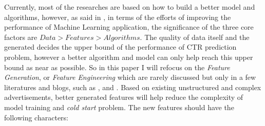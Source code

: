 Currently, most of the researches are based on how to build a better model and algorithms, however, as said in \cite{facebook2015}, in terms of the efforts of improving the performance of Machine Learning application, the significance of the three core factors are \(Data > Features > Algorithms\). The quality of data itself and the generated decides the upper bound of the performance of CTR prediction problem, however a better algorithm and model can only help reach this upper bound as near as possible. So in this paper I will refocus on the \textit{Feature Generation}, or \textit{Feature Engineering} which are rarely discussed but only in a few literatures and blogs, such as \cite{featureengineering}, and \cite{featureengineeringmeituan}. Based on existing unstructured and complex advertisements, better generated features will help reduce the complexity of model training and \textit{cold start} problem. The new features should have the following characters:
